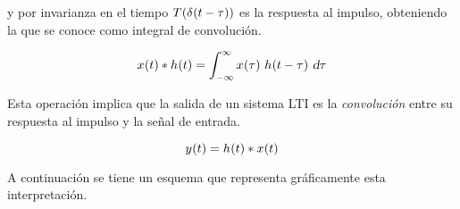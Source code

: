 y por invarianza en el tiempo $\fx[T]{\fx[\delta]{t-\tau}}$ es la respuesta al impulso, obteniendo la que se conoce como integral de convolución.

\begin{mdframed}[style=PropertyFrame]
    \begin{defn}
    \end{defn}
    \begin{equation*}
        \fx[x]{t} * \fx[h]{t} = \int_{-\infty}^\infty \fx[x]{\tau} \, \fx[h]{t-\tau} \, \dif \tau
    \end{equation*}
\end{mdframed}

Esta operación implica que la salida de un sistema LTI es la \emph{convolución} entre su respuesta al impulso y la señal de entrada.

\begin{mdframed}[style=PropertyFrame]
    \begin{prop}
    \end{prop}
    \begin{equation*}
        \fx[y]{t} = \fx[h]{t} * \fx[x]{t}
    \end{equation*}
\end{mdframed}

A continuación se tiene un esquema que representa gráficamente esta interpretación.

\begin{center}
    \def\svgwidth{0.8\linewidth}
    
\end{center}